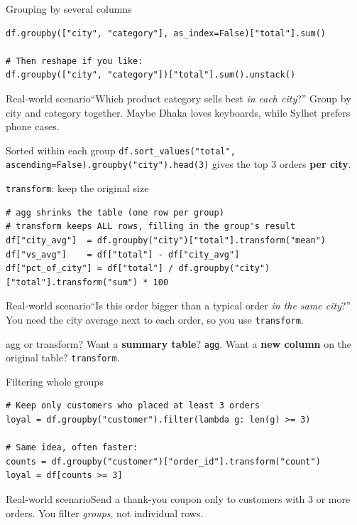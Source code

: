 \documentclass[aspectratio=169,10pt]{beamer}
\newcommand{\code}[1]{\texttt{#1}}
\newcommand{\scenario}[1]{\begin{exampleblock}{Real-world scenario}#1\end{exampleblock}}
\begin{document}
\begin{frame}[fragile]{Grouping by several columns}
\begin{lstlisting}
df.groupby(["city", "category"], as_index=False)["total"].sum()

# Then reshape if you like:
df.groupby(["city", "category"])["total"].sum().unstack()
\end{lstlisting}
  \scenario{``Which product category sells best \emph{in each city}?'' Group by city and
  category together. Maybe Dhaka loves keyboards, while Sylhet prefers phone cases.}
  \begin{block}{Sorted within each group}
    \code{df.sort\_values("total", ascending=False).groupby("city").head(3)} gives the top 3
    orders \textbf{per city}.
  \end{block}
\end{frame}

\begin{frame}[fragile]{\texttt{transform}: keep the original size}
\begin{lstlisting}
# agg shrinks the table (one row per group)
# transform keeps ALL rows, filling in the group's result
df["city_avg"]  = df.groupby("city")["total"].transform("mean")
df["vs_avg"]    = df["total"] - df["city_avg"]
df["pct_of_city"] = df["total"] / df.groupby("city")["total"].transform("sum") * 100
\end{lstlisting}
  \scenario{``Is this order bigger than a typical order \emph{in the same city}?'' You need
  the city average next to each order, so you use \code{transform}.}
  \begin{block}{agg or transform?}
    Want a \textbf{summary table}? \code{agg}. Want a \textbf{new column} on the original
    table? \code{transform}.
  \end{block}
\end{frame}

\begin{frame}[fragile]{Filtering whole groups}
\begin{lstlisting}
# Keep only customers who placed at least 3 orders
loyal = df.groupby("customer").filter(lambda g: len(g) >= 3)

# Same idea, often faster:
counts = df.groupby("customer")["order_id"].transform("count")
loyal = df[counts >= 3]
\end{lstlisting}
  \scenario{Send a thank-you coupon only to customers with 3 or more orders. You filter
  \emph{groups}, not individual rows.}
\end{frame}
\end{document}
